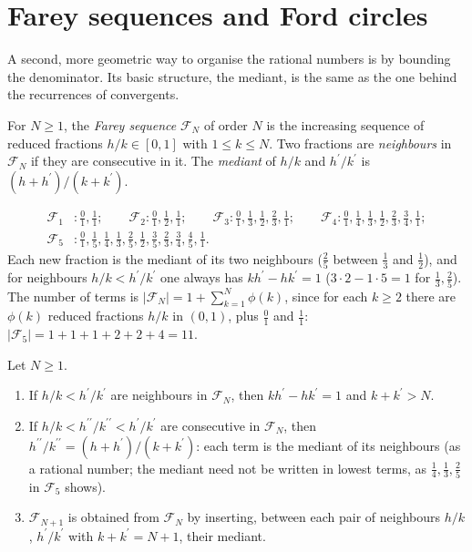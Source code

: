\section{Farey sequences and Ford circles}\label{continued-fractions:section-farey}

A second, more geometric way to organise the rational numbers is by bounding the denominator. Its basic structure, the mediant, is the same as the one behind the recurrences of convergents.

\begin{definition}\label{continued-fractions:definition-farey}
For $N \geq 1$, the \emph{Farey sequence} $\mathcal{F}_N$ of order $N$ is the increasing sequence of reduced fractions $h/k \in [0, 1]$ with $1 \leq k \leq N$. Two fractions are \emph{neighbours} in
$\mathcal{F}_N$ if they are consecutive in it. The \emph{mediant} of $h/k$ and $h^{\prime}/k^{\prime}$ is $(h + h^{\prime})/(k + k^{\prime})$.
\end{definition}

\begin{example}\label{continued-fractions:example-farey}
\[
\begin{aligned}
\mathcal{F}_1 &: \tfrac01, \tfrac11; \qquad \mathcal{F}_2 : \tfrac01, \tfrac12, \tfrac11; \qquad \mathcal{F}_3 : \tfrac01, \tfrac13, \tfrac12, \tfrac23, \tfrac11; \qquad
\mathcal{F}_4 : \tfrac01, \tfrac14, \tfrac13, \tfrac12, \tfrac23, \tfrac34, \tfrac11;\\
\mathcal{F}_5 &: \tfrac01, \tfrac15, \tfrac14, \tfrac13, \tfrac25, \tfrac12, \tfrac35, \tfrac23, \tfrac34, \tfrac45, \tfrac11.
\end{aligned}
\]
Each new fraction is the mediant of its two neighbours ($\frac25$ between $\frac13$ and $\frac12$), and for neighbours $h/k < h^{\prime}/k^{\prime}$ one always has $kh^{\prime} - hk^{\prime} = 1$
($3 \cdot 2 - 1 \cdot 5 = 1$ for $\frac13, \frac25$). The number of terms is $|\mathcal{F}_N| = 1 + \sum_{k=1}^N\phi(k)$, since for each $k \geq 2$ there are $\phi(k)$ reduced fractions $h/k$ in
$(0, 1)$, plus $\frac01$ and $\frac11$: $|\mathcal{F}_5| = 1 + 1 + 1 + 2 + 2 + 4 = 11$.
\end{example}

\begin{theorem}\label{continued-fractions:theorem-farey}
Let $N \geq 1$.
\begin{enumerate}
\item If $h/k < h^{\prime}/k^{\prime}$ are neighbours in $\mathcal{F}_N$, then $kh^{\prime} - hk^{\prime} = 1$ and $k + k^{\prime} > N$.
\item If $h/k < h^{\prime\prime}/k^{\prime\prime} < h^{\prime}/k^{\prime}$ are consecutive in $\mathcal{F}_N$, then $h^{\prime\prime}/k^{\prime\prime} = (h + h^{\prime})/(k + k^{\prime})$: each term
is the mediant of its neighbours (as a rational number; the mediant need not be written in lowest terms, as $\frac14, \frac13, \frac25$ in $\mathcal{F}_5$ shows).
\item $\mathcal{F}_{N+1}$ is obtained from $\mathcal{F}_N$ by inserting, between each pair of neighbours $h/k$, $h^{\prime}/k^{\prime}$ with $k + k^{\prime} = N + 1$, their mediant.
\end{enumerate}
\end{theorem}

